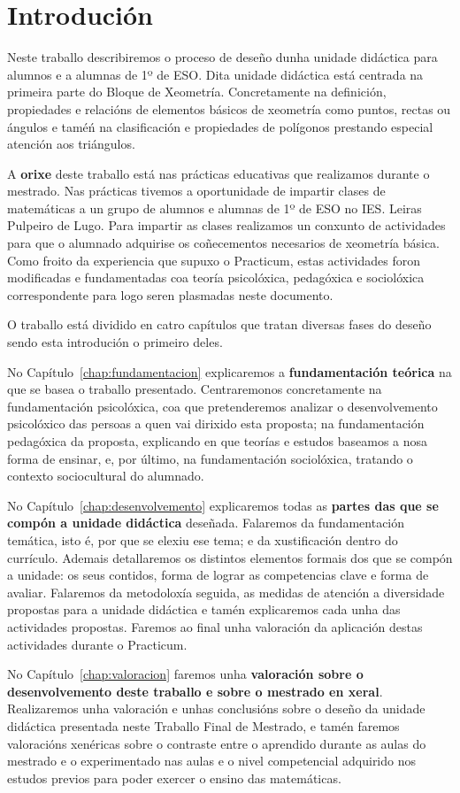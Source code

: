 %

\chapter[Introdución]{Introdución}
Neste traballo describiremos o proceso de deseño dunha unidade didáctica para alumnos e a alumnas de 1º de ESO. Dita unidade didáctica está centrada na primeira parte do Bloque de Xeometría. Concretamente na definición, propiedades e relacións de elementos básicos de xeometría como puntos, rectas ou ángulos e taméń na clasificación e propiedades de polígonos prestando especial atención aos triángulos.

A \textbf{orixe} deste traballo está nas prácticas educativas que realizamos durante o mestrado. Nas prácticas tivemos a oportunidade de impartir clases de matemáticas a un grupo de alumnos e alumnas de 1º de ESO no IES. Leiras Pulpeiro de Lugo. Para impartir as clases realizamos un conxunto de actividades para que o alumnado adquirise os coñecementos necesarios de xeometría básica. Como froito da experiencia que supuxo o Practicum, estas actividades foron modificadas e fundamentadas coa teoría psicolóxica, pedagóxica e sociolóxica correspondente para logo seren plasmadas neste documento.

O traballo está dividido en catro capítulos que tratan diversas fases do deseño sendo esta introdución o primeiro deles.

No Capítulo~\ref{chap:fundamentacion} explicaremos a \textbf{fundamentación teórica} na que se basea o traballo presentado. Centraremonos concretamente na fundamentación psicolóxica, coa que pretenderemos analizar o desenvolvemento psicolóxico das persoas a quen vai dirixido esta proposta; na fundamentación pedagóxica da proposta, explicando en que teorías e estudos baseamos a nosa forma de ensinar, e, por último, na fundamentación sociolóxica, tratando o contexto sociocultural do alumnado.

No Capítulo~\ref{chap:desenvolvemento} explicaremos todas as \textbf{partes das que se compón a unidade didáctica} deseñada. Falaremos da fundamentación temática, isto é, por que se elexiu ese tema; e da xustificación dentro do currículo. Ademais detallaremos os distintos elementos formais dos que se compón a unidade: os seus contidos, forma de lograr as competencias clave e forma de avaliar. Falaremos da metodoloxía seguida, as medidas de atención a diversidade propostas para a unidade didáctica e tamén explicaremos cada unha das actividades propostas. Faremos ao final unha valoración da aplicación destas actividades durante o Practicum.

No Capítulo~\ref{chap:valoracion} faremos unha \textbf{valoración sobre o desenvolvemento deste traballo e sobre o mestrado en xeral}. Realizaremos unha valoración e unhas conclusións sobre o deseño da unidade didáctica presentada neste Traballo Final de Mestrado, e tamén faremos valoracións xenéricas sobre o contraste entre o aprendido durante as aulas do mestrado e o experimentado nas aulas e o nivel competencial adquirido nos estudos previos para poder exercer o ensino das matemáticas.
